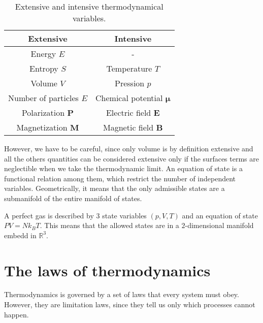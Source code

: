     \begin{table}[h!]
        \centering
        \begin{tabular}{c | c }
            Extensive & Intensive \\
            \hline
            Energy $E$ & - \\ 
            Entropy $S$ & Temperature $T$ \\ 
            Volume $V$ & Pression $p$\\ 
            Number of particles $E$ & Chemical potential $\mathbf \mu$ \\ 
            Polarization $\mathbf P$ & Electric field $\mathbf E$ \\ 
            Magnetization $\mathbf M$ & Magnetic field $\mathbf B$ \\ 
        \end{tabular}
        \caption{Extensive and intensive thermodynamical variables.}
        \label{table:1}
    \end{table}

    However, we have to be careful, since only volume is by definition extensive and all the others quantities can be considered extensive only if the surfaces terms are neglectible when we take the thermodynamic limit. An equation of state is a functional relation among them, which restrict the number of independent variables. Geometrically, it means that the only admissible states are a submanifold of the entire manifold of states. 

    \begin{example}
        A perfect gas is described by $3$ state variables $(p, V, T)$ and an equation of state $PV = N k_B T$. This means that the allowed states are in a $2$-dimensional manifold embedd in $\mathbb R^3$.
    \end{example}

\section{The laws of thermodynamics}

    Thermodynamics is governed by a set of laws that every system must obey. However, they are limitation laws, since they tell us only which processes cannot happen. 

